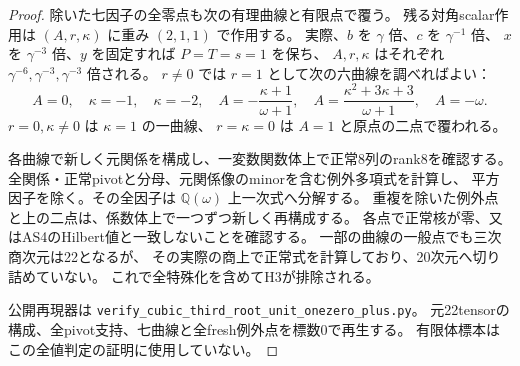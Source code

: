 \begin{proof}
除いた七因子の全零点も次の有理曲線と有限点で覆う。
残る対角scalar作用は $(A,r,\kappa)$ に重み $(2,1,1)$ で作用する。
実際、$b$ を $\gamma$ 倍、$c$ を $\gamma^{-1}$ 倍、
$x$ を $\gamma^{-3}$ 倍、$y$ を固定すれば $P=T=s=1$ を保ち、
$A,r,\kappa$ はそれぞれ $\gamma^{-6},\gamma^{-3},\gamma^{-3}$ 倍される。
$r\ne0$ では $r=1$ として次の六曲線を調べればよい：
\[
 A=0,\quad \kappa=-1,\quad \kappa=-2,\quad
 A=-\frac{\kappa+1}{\omega+1},\quad
 A=\frac{\kappa^2+3\kappa+3}{\omega+1},\quad A=-\omega.
\]
$r=0,\kappa\ne0$ は $\kappa=1$ の一曲線、
$r=\kappa=0$ は $A=1$ と原点の二点で覆われる。

各曲線で新しく元関係を構成し、一変数関数体上で正常8列のrank8を確認する。
全関係・正常pivotと分母、元関係像のminorを含む例外多項式を計算し、
平方因子を除く。その全因子は $\mathbb Q(\omega)$ 上一次式へ分解する。
重複を除いた例外点と上の二点は、係数体上で一つずつ新しく再構成する。
各点で正常核が零、又はAS4のHilbert値と一致しないことを確認する。
一部の曲線の一般点でも三次商次元は22となるが、
その実際の商上で正常式を計算しており、20次元へ切り詰めていない。
これで全特殊化を含めてH3が排除される。

公開再現器は \texttt{verify\_cubic\_third\_root\_unit\_onezero\_plus.py}。
元22tensorの構成、全pivot支持、七曲線と全fresh例外点を標数0で再生する。
有限体標本はこの全値判定の証明に使用していない。
\end{proof}
